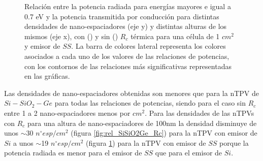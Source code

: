 \begin{figure}[H]
\begin{subfigure}[b]{0.49\textwidth}
		\label{fig:rel_SsSiO2Ge_Rc_emp}
	\end{subfigure}
	\caption{\small Relación entre la potencia radiada para energías mayores e igual a 0.7 eV y la potencia transmitida por conducción para distintas densidades de nano-espaciadores (eje y) y distintas alturas de los mismos (eje x), con () y sin () $R_c$ térmica para una célula de 1 $cm^2$ y emisor de $SS$. La barra de colores lateral representa los colores asociados a cada uno de los valores de las relaciones de potencias, con los contornos de las relaciones más significativas representadas en las gráficas.
	}
	\label{fig:rels_SsSiO2Ge_PnvsRc}
\end{figure}
Las densidades de nano-espaciadores obtenidas son menores que para la nTPV de $Si-SiO_2-Ge$ para todas las relaciones de potencias, siendo para el caso sin $R_c$ entre 1 a 2 nano-espaciadores menos por $cm^2$. Para las densidades de las nTPVs con $R_c$ para una altura de nano-espaciadores de 100nm la densidad disminuye de unos $\sim$30 $n^{\circ} esp/cm^2$ (figura \ref{fig:rel_SiSiO2Ge_Rc}) para la nTPV con emisor de $Si$ a unos $\sim$19 $n^{\circ} esp/cm^2$ (figura \ref{fig:rel_SsSiO2Ge_Rc_emp}) para la nTPV con emisor de $SS$ porque la potencia radiada es menor para el emisor de $SS$ que para el emisor de $Si$.

